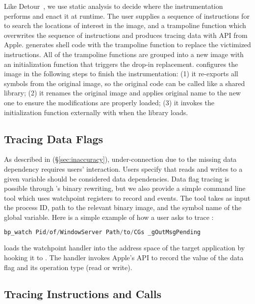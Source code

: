 Like Detour~\cite{hunt1999detours}, we use static analysis to decide where the
instrumentation performs and enact it at runtime. The user supplies a sequence
of instructions for \xxx to search the locations of interest in the image, and a
trampoline function which overwrites the sequence of instructions and produces
tracing data with API  from Apple. \xxx generates shell code
with the trampoline function to replace the victimized instructions. All of
the trampoline functions are grouped into a new image with an initialization
function that triggers the drop-in replacement. \xxx configures the image in the
following steps to finish the instrumentation: (1) it re-exports all symbols
from the original image, so the original code can be called like a shared
library; (2) it renames the original image and applies original name to the
new one to ensure the modifications are properly loaded; (3) it invokes the
initialization function externally with  when the library
loads.

\subsection{Tracing Data Flags} \label{subsec:tcp}

As described in (\S\ref{sec:inaccuracy}), under-connection due to the missing
data dependency requires users' interaction. Users specify that reads and writes
to a given variable should be considered data dependencies. Data flag tracing
is possible through \xxx's binary rewriting, but we also provide a simple
command line tool which uses watchpoint registers to record \dataflagwrite and
\dataflagread events. The tool  takes as input the process ID,
path to the relevant binary image, and the symbol name of the global variable.
Here is a simple example of how a user asks \xxx to trace :

\begin{lstlisting}[language=c++,numbers=none]
bp_watch Pid/of/WindowServer Path/to/CGs _gOutMsgPending
\end{lstlisting}

\noindent \xxx loads the watchpoint handler into the address space of the target
application by hooking it to . The handler invokes Apple's
API  to record the value of the data flag and its operation
type (read or write).

\subsection{Tracing Instructions and Calls}

